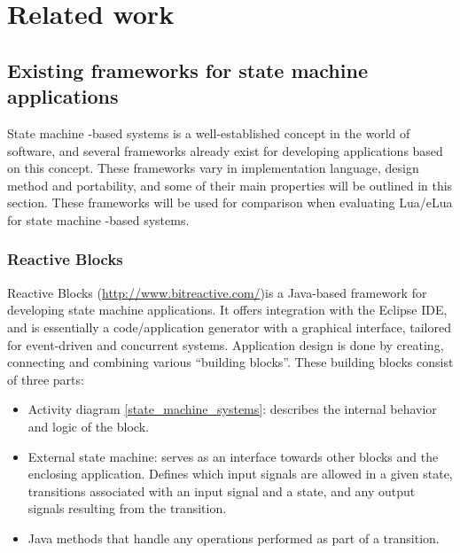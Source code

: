 \chapter{Related work}
\label{ch:related_work}

\section{Existing frameworks for state machine applications}
State machine -based systems is a well-established concept in the world of software, and several frameworks already exist for developing applications based on this concept. These frameworks vary in implementation language, design method and portability, and some of their main properties will be outlined in this section. These frameworks will be used for comparison when evaluating Lua/eLua for state machine -based systems.

\subsection{Reactive Blocks}
Reactive Blocks (\url{http://www.bitreactive.com/})is a Java-based framework for developing state machine applications. It offers integration with the Eclipse IDE, and is essentially a code/application generator with a graphical interface, tailored for event-driven and concurrent systems. Application design is done by creating, connecting and combining various “building blocks”. These building blocks consist of three parts:
\begin{itemize}
	\item Activity diagram \ref{state_machine_systems}: describes the internal behavior and logic of the block.
	\item External state machine: serves as an interface towards other blocks and the enclosing application. Defines which input signals are allowed in a given state, transitions associated with an input signal and a state, and any output signals resulting from the transition.
	\item Java methods that handle any operations performed as part of a transition.
\end{itemize} 

